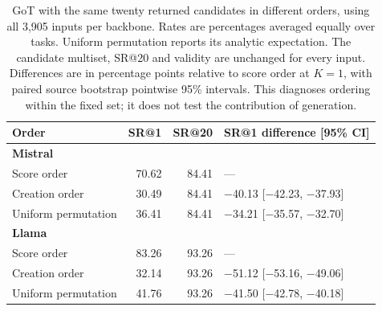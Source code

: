 \begin{table}[!htbp]
\centering
\setlength{\tabcolsep}{4pt}
\caption{GoT with the same twenty returned candidates in different orders, using all 3,905 inputs per backbone. Rates are percentages averaged equally over tasks. Uniform permutation reports its analytic expectation. The candidate multiset, SR@20 and validity are unchanged for every input. Differences are in percentage points relative to score order at $K=1$, with paired source bootstrap pointwise 95\% intervals. This diagnoses ordering within the fixed set; it does not test the contribution of generation.}
\label{tab:supp-got-order}
\begin{tabular}{lrrl}
\toprule
Order & SR@1 & SR@20 & SR@1 difference [95\% CI] \\
\midrule
\multicolumn{4}{l}{\textbf{Mistral}} \\
Score order & 70.62 & 84.41 & --- \\
Creation order & 30.49 & 84.41 & $-$40.13 [$-$42.23, $-$37.93] \\
Uniform permutation & 36.41 & 84.41 & $-$34.21 [$-$35.57, $-$32.70] \\
\midrule
\multicolumn{4}{l}{\textbf{Llama}} \\
Score order & 83.26 & 93.26 & --- \\
Creation order & 32.14 & 93.26 & $-$51.12 [$-$53.16, $-$49.06] \\
Uniform permutation & 41.76 & 93.26 & $-$41.50 [$-$42.78, $-$40.18] \\
\bottomrule
\end{tabular}
\end{table}

